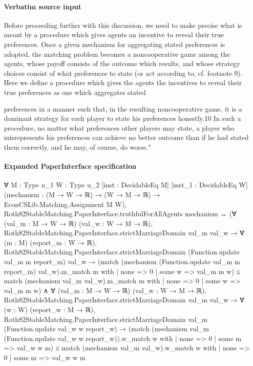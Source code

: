 \documentclass[10pt]{article}
\begin{document}
\paragraph{Verbatim source input}
\begin{ReviewVerbatim}
Before proceeding further with this discussion, we need to make precise what is
meant by a procedure which gives agents an incentive to reveal their true preferences.
Once a given mechanism for aggregating stated preferences is adopted, the matching
problem becomes a noncooperative game among the agents, whose payoff consists of
the outcome which results, and whose strategy choices consist of what preferences to
state (or act according to, cf. footnote 9). Here we define a procedure which gives the
agents the incentives to reveal their true preferences as one which aggregates stated

preferences in a manner such that, in the resulting noncooperative game, it is a
dominant strategy for each player to state his preferences honestly.10 In such a
procedure, no matter what preferences other players may state, a player who misrepresents his preferences can achieve no better outcome than if he had stated them
correctly, and he may, of course, do worse."
\end{ReviewVerbatim}


\paragraph{Expanded PaperInterface specification}
\begin{ReviewVerbatim}
∀ {M : Type u_1} {W : Type u_2} [inst : DecidableEq M] [inst_1 : DecidableEq W]
  (mechanism : (M → W → ℝ) → (W → M → ℝ) → EconCSLib.Matching.Assignment M W),
  Roth82StableMatching.PaperInterface.truthfulForAllAgents mechanism ↔
    (∀ (val_m : M → W → ℝ) (val_w : W → M → ℝ),
        Roth82StableMatching.PaperInterface.strictMarriageDomain val_m val_w →
          ∀ (m : M) (report_m : W → ℝ),
            Roth82StableMatching.PaperInterface.strictMarriageDomain (Function.update val_m m report_m) val_w →
              (match (mechanism (Function.update val_m m report_m) val_w).m_match m with
                | none => 0
                | some w => val_m m w) ≤
                match (mechanism val_m val_w).m_match m with
                | none => 0
                | some w => val_m m w) ∧
      ∀ (val_m : M → W → ℝ) (val_w : W → M → ℝ),
        Roth82StableMatching.PaperInterface.strictMarriageDomain val_m val_w →
          ∀ (w : W) (report_w : M → ℝ),
            Roth82StableMatching.PaperInterface.strictMarriageDomain val_m (Function.update val_w w report_w) →
              (match (mechanism val_m (Function.update val_w w report_w)).w_match w with
                | none => 0
                | some m => val_w w m) ≤
                match (mechanism val_m val_w).w_match w with
                | none => 0
                | some m => val_w w m
\end{ReviewVerbatim}
\end{document}
